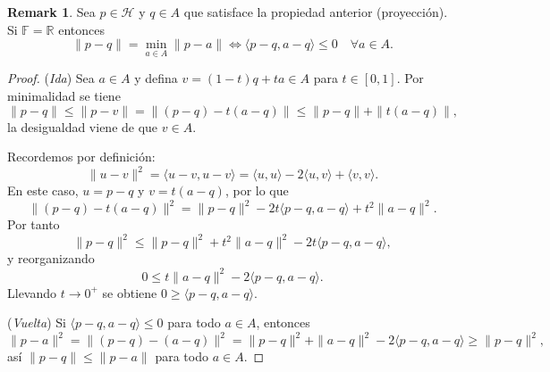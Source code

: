 \documentclass[11pt]{article}
\theoremstyle{definition}
\newtheorem{remark}[definition]{Remark}
\theoremstyle{plain}
\begin{document}
\begin{remark}
Sea $p\in\mathcal{H}$ y $q\in A$ que satisface la propiedad anterior (proyección). Si $\mathbb{F}=\mathbb{R}$ entonces
$$\|p-q\|=\min_{a\in A}\|p-a\|\iff\langle p-q,a-q\rangle\le0\quad\forall a\in A.$$
\begin{proof}
(\emph{Ida}) Sea $a\in A$ y defina $v=(1-t)q+ta\in A$ para $t\in[0,1]$. Por minimalidad se tiene
$$\|p-q\|\le\|p-v\|=\|(p-q)-t(a-q)\|\le\|p-q\|+\|t(a-q)\|,$$
la desigualdad viene de que $v\in A$.

Recordemos por definición:
$$\|u-v\|^2=\langle u-v,u-v\rangle=\langle u,u\rangle-2\langle u,v\rangle+\langle v,v\rangle.$$
En este caso, $u=p-q$ y $v=t(a-q)$, por lo que
$$\|(p-q)-t(a-q)\|^2=\|p-q\|^2-2t\langle p-q,a-q\rangle+t^2\|a-q\|^2.$$
Por tanto
$$\|p-q\|^2\le\|p-q\|^2+t^2\|a-q\|^2-2t\langle p-q,a-q\rangle,$$
y reorganizando
$$0\le t\|a-q\|^2-2\langle p-q,a-q\rangle.$$ 
Llevando $t\to0^+$ se obtiene $0\ge\langle p-q,a-q\rangle$.

(\emph{Vuelta}) Si $\langle p-q,a-q\rangle\le0$ para todo $a\in A$, entonces
$$\|p-a\|^2=\|(p-q)-(a-q)\|^2=\|p-q\|^2+\|a-q\|^2-2\langle p-q,a-q\rangle\ge\|p-q\|^2,$$
así $\|p-q\|\le\|p-a\|$ para todo $a\in A$.
\end{proof}
\end{remark}
\end{document}
